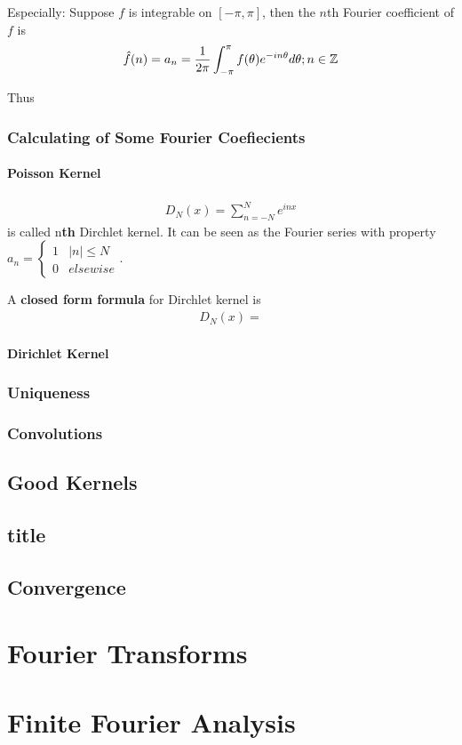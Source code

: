 \documentclass[Total.tex]{subfiles}
\begin{document}
				Especially: Suppose $f$ is integrable on $[-\pi,\pi]$, then the $n$th Fourier coefficient of $f$ is
				\begin{gather*}
					\hat{f}(n)=a_n=\frac{1}{2\pi}\int_{-\pi}^{\pi} f(\theta)e^{-in\theta} d\theta;n\in \mathbb{Z}
				\end{gather*}
				
				Thus
				\subsection{Calculating of Some Fourier Coefiecients}
					\subsubsection{Poisson Kernel}
						\begin{gather*}
							D_N(x)=\sum_{n=-N}^N e^{inx}
						\end{gather*}
						is called n\textbf{th} Dirchlet kernel. It can be seen as the Fourier series with property $a_n=\begin{cases}
							1&|n|\leq N\\
							0&elsewise
						\end{cases}$. 
						
						A \textbf{closed form formula} for Dirchlet kernel is
						\begin{gather*}
							D_N(x)=
						\end{gather*}
					\subsubsection{Dirichlet Kernel}
				\subsection{Uniqueness}
				\subsection{Convolutions}
			\section{Good Kernels}
			\section{title}
			\section{Convergence}
	\chapter{Fourier Transforms}
	\chapter{Finite Fourier Analysis}
\end{document}
